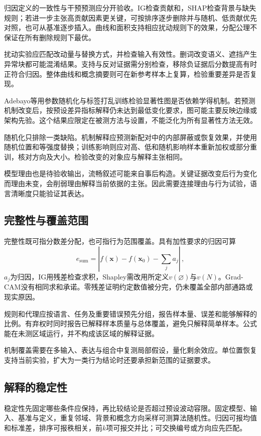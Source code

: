 归因定义的一致性与干预预测应分开验收。IG检查贡献和，SHAP检查背景与缺失规则；若进一步主张高贡献因素更关键，可按排序逐步删除并与随机、低贡献优先对照，也可从基准逐步插入。曲线和面积支持相应扰动规则下的效果，分配公理不保证在所有删除规则下最优。

扰动实验应匹配改动量与替换方式，并检查输入有效性。删词改变语义、遮挡产生异常块都可能混淆结果。支持与反对证据需分别检查，移除负证据后分数提高有时正符合归因。整体曲线和概念摘要则可在新参考样本上复算，检验重要差异是否复现。

Adebayo等用参数随机化与标签打乱训练检验显著性图是否依赖学得机制。若预测机制改变后，按预设差异指标解释仍未达到最低变化要求，图可能主要反映边缘或架构先验。这个结果应限定在被测方法与设置，不能泛化为所有显著性方法无效。

随机化只排除一类缺陷。机制解释应预测新配对中的内部屏蔽或恢复效果，并使用随机位置和等强度替换；训练影响则应对高、低和随机影响样本重新加权或部分重训，核对方向及大小。检验改变的对象应与解释主张相同。

模型理由也是待验收输出，流畅叙述可能来自事后构造。关键证据改变后行为变化而理由未变，会削弱理由解释当前依据的主张。因此需要连接理由与行为试验，语言清晰度只能验证其表达。

\subsection{完整性与覆盖范围}
\label{sec:interpretability-quality-coverage}

完整性既可指分数差分配，也可指行为范围覆盖。具有加性要求的归因可算
\[
 e_{\mathrm{sum}}
 =\left|f(\bm{x})-f(\bm{x}_0)-\sum_j a_j\right|\, ,
\]
$a_j$为归因，IG用残差检查求积，Shapley需改用所定义$v(\varnothing)$与$v(N)$。Grad-CAM没有相同求和承诺。零残差证明约定数值被分完，仍未覆盖全部内部通路或现实原因。

规则和代理应按语言、任务及重要错误预先分组，报告样本量、误差和能够解释的比例。有弃权时同时报告已解释样本质量与总体覆盖，避免只解释简单样本。公式能在未测区域运行，并不构成该区域的解释证据。

机制覆盖需要在多输入、表达与组合中复测局部假设，量化剩余效应。单位置恢复支持当前实验，扩大为一类行为结论时还要承担新范围的证据要求。

\subsection{解释的稳定性}
\label{sec:interpretability-quality-stability}

稳定性先固定哪些条件应保持，再比较结论是否超过预设波动容限。固定模型、输入、基准与定义，重复邻域、背景和概念方向采样可测算法随机性。归因可报均值和标准差，排序可报秩相关，前$k$项可报交并比；可交换编号或方向应先匹配。

